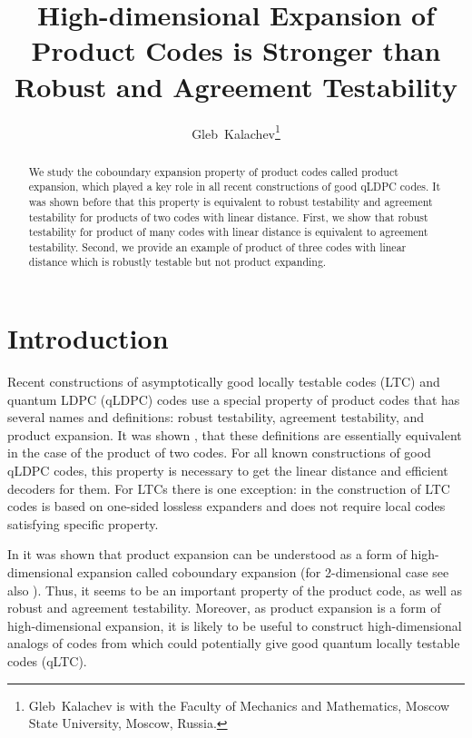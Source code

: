 \documentclass[11pt]{article}
\title{High-dimensional Expansion of Product Codes is Stronger than Robust and Agreement Testability}
\author{Gleb~Kalachev\thanks{Gleb~Kalachev is with the Faculty of Mechanics and Mathematics, Moscow State University, Moscow, Russia.%
}}
\begin{document}

\maketitle
\begin{abstract}
    We study the coboundary expansion property of product codes called product expansion, which played a key role in all recent constructions of good qLDPC codes. It was shown before that this property is equivalent to robust testability and agreement testability for products of two codes with linear distance. First, we show that robust testability for product of many codes with linear distance is equivalent to agreement testability. Second, we provide an example of product of three codes with linear distance which is robustly testable but not product expanding.
\end{abstract}
\section{Introduction}
Recent constructions of asymptotically good locally testable codes (LTC) and quantum LDPC (qLDPC) codes \cite{Panteleev&Kalachev:stoc2022,Dinur:stoc2022,Dinur:decoders,Leverrier:focs2022,Leverrier:qldpcdecoder:2023,Leverrier:2023,Gu:stoc2023:qpdpc-decoder} use a special property of product codes that has several names and definitions: robust testability, agreement testability, and product expansion. It was shown \cite[Lemma 2.9]{Dinur:stoc2022}, \cite[Lemma 1]{PK2022robust} that these definitions are essentially equivalent in the case of the product of two codes. For all known constructions of good qLDPC codes, this property is necessary to get the linear distance and efficient decoders for them. For LTCs there is one exception: in \cite{Lin2022:losslessLTC} the construction of LTC codes is based on one-sided lossless expanders and does not require local codes satisfying specific property.

In \cite[Appendix B]{PK2022robust} it was shown that product expansion can be understood as a form of high-dimensional expansion called coboundary expansion (for 2-dimensional case see also \cite[Section 2.6]{Dinur:decoders}).
Thus, it seems to be an important property of the product code, as well as robust and agreement testability. Moreover, as product expansion is a form of high-dimensional expansion, it is likely to be useful to construct high-dimensional analogs of codes from \cite{Dinur:stoc2022,Panteleev&Kalachev:stoc2022} which could potentially give good quantum locally testable codes (qLTC). 
\end{document}
